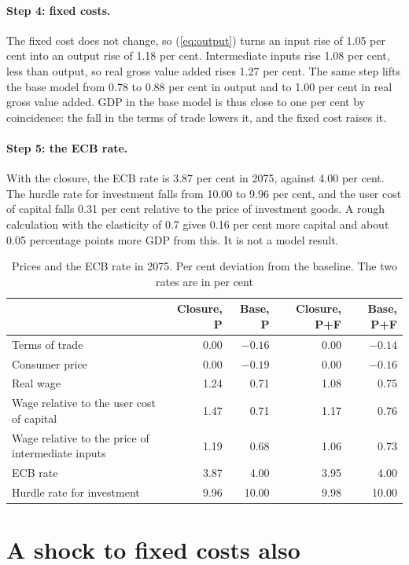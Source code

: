 \documentclass[11pt,a4paper]{article}
\begin{document}
\paragraph{Step 4: fixed costs.}
The fixed cost does not change, so (\ref{eq:output}) turns an input rise of 1.05 per cent into an output rise of 1.18 per cent. Intermediate inputs rise 1.08 per cent, less than output, so real gross value added rises 1.27 per cent.
The same step lifts the base model from 0.78 to 0.88 per cent in output and to 1.00 per cent in real gross value added. GDP in the base model is thus close to one per cent by coincidence: the fall in the terms of trade lowers it, and the fixed cost raises it.

\paragraph{Step 5: the ECB rate.}
With the closure, the ECB rate is 3.87 per cent in 2075, against 4.00 per cent. The hurdle rate for investment falls from 10.00 to 9.96 per cent, and the user cost of capital falls 0.31 per cent relative to the price of investment goods.
A rough calculation with the elasticity of 0.7 gives 0.16 per cent more capital and about 0.05 percentage points more GDP from this. It is not a model result.

\begin{table}[H]
\centering
\small
\caption{Prices and the ECB rate in 2075. Per cent deviation from the baseline. The two rates are in per cent}
\label{tab:prices}
\begin{tabular}{@{}lrrrr@{}}
\toprule
 & Closure, P & Base, P & Closure, P+F & Base, P+F \\
\midrule
Terms of trade & 0.00 & $-0.16$ & 0.00 & $-0.14$ \\
Consumer price & 0.00 & $-0.19$ & 0.00 & $-0.16$ \\
Real wage & 1.24 & 0.71 & 1.08 & 0.75 \\
Wage relative to the user cost of capital & 1.47 & 0.71 & 1.17 & 0.76 \\
Wage relative to the price of intermediate inputs & 1.19 & 0.68 & 1.06 & 0.73 \\
\midrule
ECB rate & 3.87 & 4.00 & 3.95 & 4.00 \\
Hurdle rate for investment & 9.96 & 10.00 & 9.98 & 10.00 \\
\bottomrule
\end{tabular}
\end{table}

\section{A shock to fixed costs also}
\end{document}
